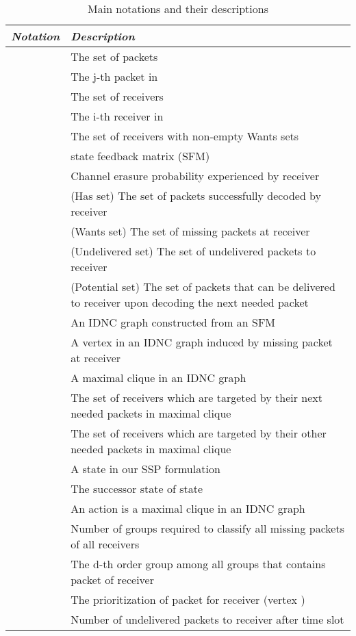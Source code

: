 \documentclass[12pt, peerreview, onecolumn]{IEEEtran}
\begin{document}
\begin{table}\caption{Main notations and their descriptions}
 \centering
    \begin{tabular}{|c| p{15.5cm}|}
    \hline
    \textit{Notation} &  \textit{Description} \\ \hline
     & The set of  packets \\ \hline
     &  The j-th packet in \\ \hline
     & The set of  receivers \\ \hline
     & The i-th receiver in \\ \hline
     & The set of receivers with non-empty Wants sets \\ \hline
     &  state feedback matrix (SFM)\\ \hline
     & Channel erasure probability experienced by receiver  \\ \hline
     & (Has set) The set of packets successfully decoded by  receiver   \\ \hline
     & (Wants set) The set of missing packets at receiver  \\ \hline
     & (Undelivered set) The set of undelivered packets to receiver  \\ \hline
     & (Potential set) The set of  packets that can be delivered to receiver  upon decoding the next needed packet \\ \hline
     & An IDNC graph constructed from an SFM \\ \hline
     & A  vertex in an IDNC graph induced by  missing packet  at receiver \\ \hline
     & A maximal clique in an IDNC graph \\ \hline
     & The set of  receivers which are  targeted by their next needed packets in  maximal clique \\ \hline
     & The set of  receivers which are  targeted by their other needed packets in  maximal clique \\ \hline
     & A state  in our SSP formulation  \\ \hline
      & The successor state of state  \\ \hline
     & An action is a maximal clique  in an IDNC graph  \\ \hline
     & Number of groups required to classify all missing packets  of all receivers \\ \hline
     & The d-th order  group among all  groups that contains packet  of receiver    \\ \hline
     & The prioritization of packet  for receiver  (vertex )\\ \hline
     &  Number of undelivered  packets to receiver  after time slot  \\ \hline
    \end{tabular}
\end{table}
\end{document}
